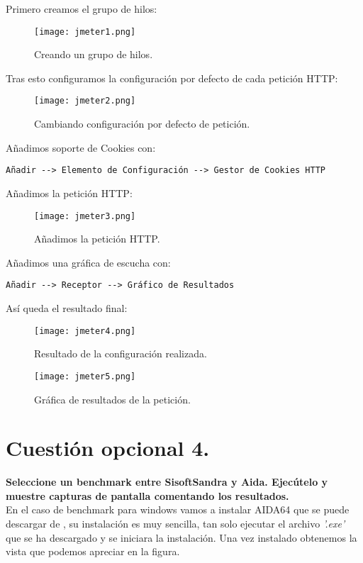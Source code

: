 \documentclass[a4paper, 10pt]{article} %
\begin{document}
Primero creamos el grupo de hilos:
\begin{figure}[H]
\centering 
\texttt{[image: jmeter1.png]} 
\caption{Creando un grupo de hilos.} 
\label{contexto:figura} 
\end{figure}

Tras esto configuramos la configuración por defecto de cada petición HTTP:
\begin{figure}[H]
\centering 
\texttt{[image: jmeter2.png]} 
\caption{Cambiando configuración por defecto de petición.} 
\label{contexto:figura} 
\end{figure}

Añadimos soporte de Cookies con:
\begin{verbatim}
Añadir --> Elemento de Configuración --> Gestor de Cookies HTTP
\end{verbatim}

Añadimos la petición HTTP: 
\begin{figure}[H]
\centering 
\texttt{[image: jmeter3.png]} 
\caption{Añadimos la petición HTTP.} 
\label{contexto:figura} 
\end{figure}

Añadimos una gráfica de escucha con:
\begin{verbatim}
Añadir --> Receptor --> Gráfico de Resultados
\end{verbatim}

Así queda el resultado final:
\begin{figure}[H]
\centering 
\texttt{[image: jmeter4.png]} 
\caption{Resultado de la configuración realizada.} 
\label{contexto:figura} 
\end{figure}

\begin{figure}[H]
\centering 
\texttt{[image: jmeter5.png]} 
\caption{Gráfica de resultados de la petición.} 
\label{contexto:figura} 
\end{figure}

\pagebreak

\section{Cuestión opcional 4.}
\textbf{Seleccione un benchmark entre SisoftSandra y Aida. Ejecútelo y muestre capturas de pantalla comentando los resultados.}\\

En el caso de benchmark para windows vamos a instalar AIDA64 que se puede descargar de \cite{6}, su instalación es muy sencilla, tan solo ejecutar el archivo \textit{'.exe'} que se ha descargado y se iniciara la instalación. Una vez instalado obtenemos la vista que podemos apreciar en la figura.
\end{document}
